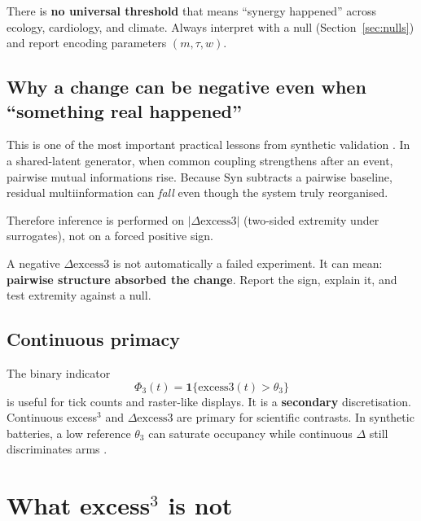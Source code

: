 \documentclass[11pt,a4paper]{article}
\begin{document}
\begin{warningbox}
There is \textbf{no universal threshold} that means ``synergy happened''
across ecology, cardiology, and climate. Always interpret with a null
(Section~\ref{sec:nulls}) and report encoding parameters $(m,\tau,w)$.
\end{warningbox}

\subsection{Why a change can be negative even when ``something real happened''}

This is one of the most important practical lessons from synthetic
validation \citep{Padilla2026excess3}. In a shared-latent generator, when
common coupling strengthens after an event, pairwise mutual informations
rise. Because $\mathrm{Syn}$ subtracts a pairwise baseline, residual
multiinformation can \emph{fall} even though the system truly reorganised.

Therefore inference is performed on
$|\Delta\mathrm{excess3}|$
(two-sided extremity under surrogates), not on a forced positive sign.

\begin{keyidea}
A negative $\Delta\mathrm{excess3}$ is not automatically a failed
experiment. It can mean: \textbf{pairwise structure absorbed the change}.
Report the sign, explain it, and test extremity against a null.
\end{keyidea}

\subsection{Continuous primacy}

The binary indicator
\begin{equation}
\Phi_3(t)=\mathbf{1}\{\mathrm{excess3}(t)>\theta_3\}
\end{equation}
is useful for tick counts and raster-like displays. It is a
\textbf{secondary} discretisation. Continuous excess$^3$ and
$\Delta\mathrm{excess3}$ are primary for scientific contrasts. In synthetic
batteries, a low reference $\theta_3$ can saturate occupancy while continuous
$\Delta$ still discriminates arms \citep{Padilla2026excess3}.

\section{What excess$^3$ is not}
\label{sec:not}
\end{document}
